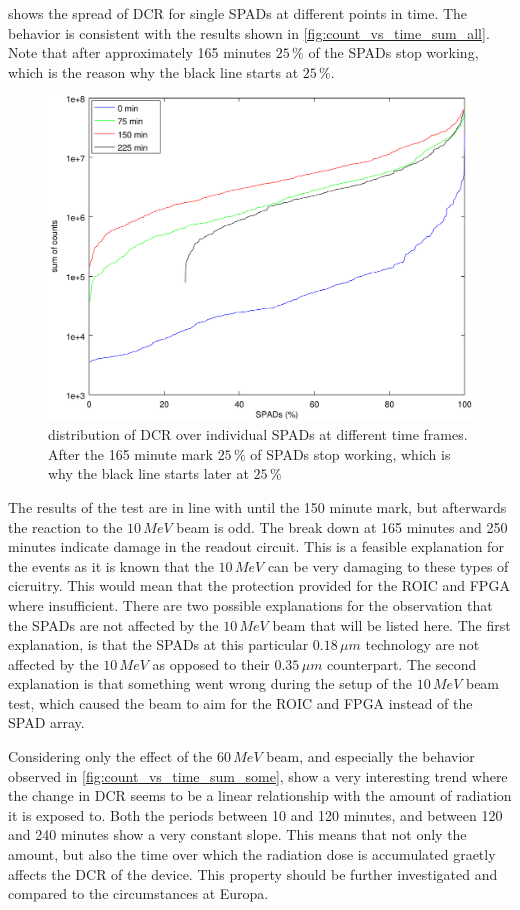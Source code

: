  shows the spread of DCR for single SPADs at different points in time. The behavior is consistent with the results shown in \cref{fig:count_vs_time_sum_all}. Note that after approximately 165 minutes $25\,\%$ of the SPADs stop working, which is the reason why the black line starts at $25\,\%$.

\begin{figure}[h]
\centering
	\includegraphics[width=0.6\linewidth]{fig/sigmoid_sweep.pdf}
\caption{distribution of DCR over individual SPADs at different time frames. After the 165 minute mark $25\,\%$ of SPADs stop working, which is why the black line starts later at $25\,\%$}
\label{fig:sigmoid_sweep}
\end{figure}


The results of the test are in line with until the 150 minute mark, but afterwards the reaction to the $10\,MeV$ beam is odd. The break down at 165 minutes and 250 minutes indicate damage in the readout circuit. This is a feasible explanation for the events as it is known that the $10\,MeV$ can be very damaging to these types of cicruitry. This would mean that the protection provided for the ROIC and FPGA where insufficient. There are two possible explanations for the observation that the SPADs are not affected by the $10\,MeV$ beam that will be listed here. The first explanation, is that the SPADs at this particular $0.18\,\mu m$ technology are not affected by the $10\,MeV$ as opposed to their $0.35\,\mu m$ counterpart. The second explanation is that something went wrong during the setup of the $10\,MeV$ beam test, which caused the beam to aim for the ROIC and FPGA instead of the SPAD array. 

Considering only the effect of the $60\,MeV$ beam, and especially the behavior observed in \cref{fig:count_vs_time_sum_some}, show a very interesting trend where the change in DCR seems to be a linear relationship with the amount of radiation it is exposed to. Both the periods between 10 and 120 minutes, and between 120 and 240 minutes show a very constant slope. This means that not only the amount, but also the time over which the radiation dose is accumulated graetly affects the DCR of the device. This property should be further investigated and compared to the circumstances at Europa.
